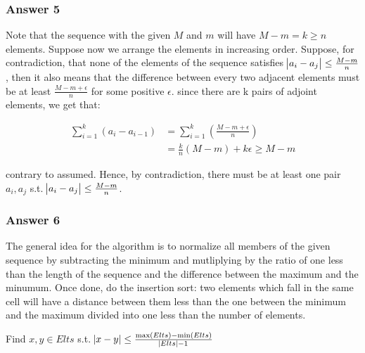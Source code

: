 \documentclass[11pt]{article}
\begin{document}
\subsubsection{Answer 5}
\label{sec-1-5-1}
Note that the sequence with the given $M$ and $m$ will have $M - m = k \geq
    n$ elements.  Suppose now we arrange the elements in increasing order.
Suppose, for contradiction, that none of the elements of the sequence
satisfies $\abs{a_i - a_j} \leq \frac{M - m}{n}$, then it also means that
the difference between every two adjacent elements must be at least
$\frac{M - m + \epsilon}{n}$ for some positive $\epsilon$.  since there are
k pairs of adjoint elements, we get that:

\begin{align*}
  \sum_{i=1}^k\left(a_i - a_{i-1}\right) &= \sum_{i=1}^k\left(\frac{M - m + \epsilon}{n}\right) \\
  &= \frac{k}{n}\left(M - m\right) + k \epsilon \geq M - m
\end{align*}

contrary to assumed.  Hence, by contradiction, there must be at least one
pair $a_i, a_j$ s.t. $\abs{a_i - a_j} \leq \frac{M - m}{n}$.

\subsubsection{Answer 6}
\label{sec-1-5-2}
The general idea for the algorithm is to normalize all members of the given
sequence by subtracting the minimum and mutliplying by the ratio of one less
than the length of the sequence and the difference between the maximum and
the minumum.  Once done, do the insertion sort: two elements which fall in
the same cell will have a distance between them less than the one between
the minimum and the maximum divided into one less than the number of elements.

\begin{algorithm}
  \caption{Find $x, y \in Elts$ s.t. $\abs{x - y} \leq \frac{\max(Elts) - \min(Elts)}{\abs{Elts} - 1}$}
  \begin{algorithmic}
    \State {}
    \State {}
    \State {}
    \State {}
     \Do
     \Then
    \Else
    \EndIf
    \EndFor
    \EndProcedure
  \end{algorithmic}
\end{algorithm}
\end{document}
